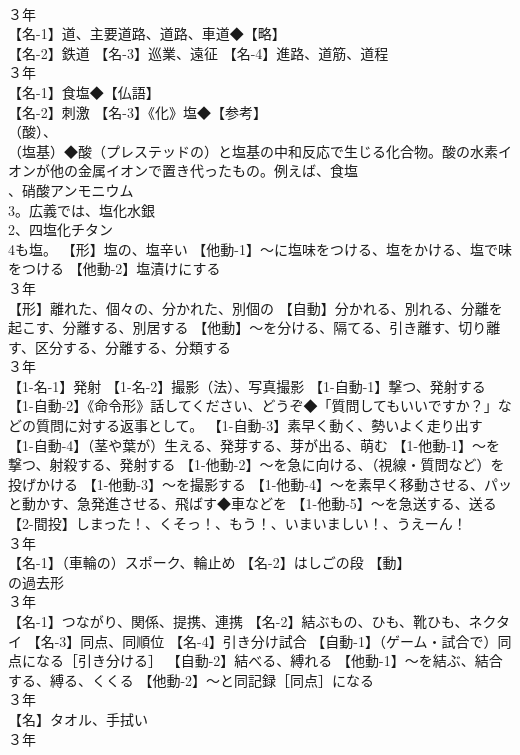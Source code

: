 \documentclass[8pt]{extreport}
\begin{document}
\begin{CJK}{UTF8}{min}
\\	３年	
\\	【名-1】道、主要道路、道路、車道◆【略】
\\	【名-2】鉄道 【名-3】巡業、遠征 【名-4】進路、道筋、道程
\\	３年	
\\	【名-1】食塩◆【仏語】
\\	【名-2】刺激 【名-3】《化》塩◆【参考】
\\	（酸）、
\\	（塩基）◆酸（プレステッドの）と塩基の中和反応で生じる化合物。酸の水素イオンが他の金属イオンで置き代ったもの。例えば、食塩 
\\	、硝酸アンモニウム 
\\	3。広義では、塩化水銀
\\	2、四塩化チタン 
\\	4も塩。 【形】塩の、塩辛い 【他動-1】～に塩味をつける、塩をかける、塩で味をつける 【他動-2】塩漬けにする
\\	３年	
\\	【形】離れた、個々の、分かれた、別個の 【自動】分かれる、別れる、分離を起こす、分離する、別居する 【他動】～を分ける、隔てる、引き離す、切り離す、区分する、分離する、分類する
\\	３年	
\\	【1-名-1】発射 【1-名-2】撮影（法）、写真撮影 【1-自動-1】撃つ、発射する 【1-自動-2】《命令形》話してください、どうぞ◆「質問してもいいですか？」などの質問に対する返事として。 【1-自動-3】素早く動く、勢いよく走り出す 【1-自動-4】（茎や葉が）生える、発芽する、芽が出る、萌む 【1-他動-1】～を撃つ、射殺する、発射する 【1-他動-2】～を急に向ける、（視線・質問など）を投げかける 【1-他動-3】～を撮影する 【1-他動-4】～を素早く移動させる、パッと動かす、急発進させる、飛ばす◆車などを 【1-他動-5】～を急送する、送る 【2-間投】しまった！、くそっ！、もう！、いまいましい！、うえーん！
\\	３年	
\\	【名-1】（車輪の）スポーク、輪止め 【名-2】はしごの段 【動】
\\	の過去形
\\	３年	
\\	【名-1】つながり、関係、提携、連携 【名-2】結ぶもの、ひも、靴ひも、ネクタイ 【名-3】同点、同順位 【名-4】引き分け試合 【自動-1】（ゲーム・試合で）同点になる［引き分ける］ 【自動-2】結べる、縛れる 【他動-1】～を結ぶ、結合する、縛る、くくる 【他動-2】～と同記録［同点］になる
\\	３年	
\\	【名】タオル、手拭い
\\	３年	

\end{CJK}
\end{document}
